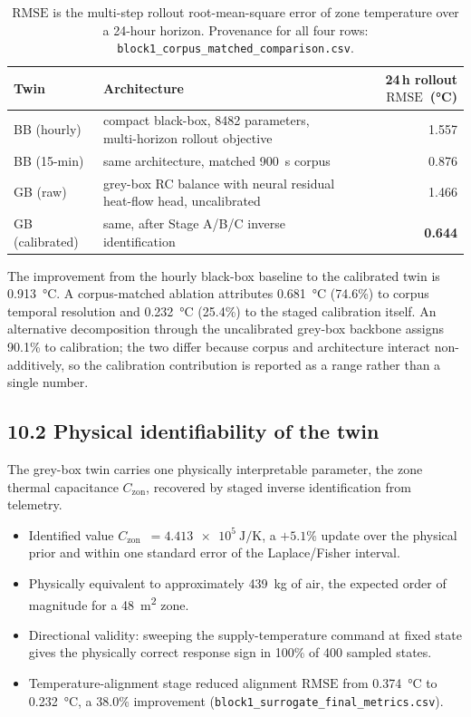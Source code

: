 \documentclass[11pt,a4paper]{article}
\newcommand{\RMSE}{\ensuremath{\mathrm{RMSE}}}
\newcommand{\Czon}{\ensuremath{C_{\mathrm{zon}}}}
\begin{document}
\begin{table}[h]
\centering\small
\begin{tabularx}{\linewidth}{@{}lXr@{}}
\toprule
Twin & Architecture & 24\,h rollout \RMSE\ (\si{\celsius}) \\
\midrule
BB (hourly) & compact black-box, 8482 parameters, multi-horizon rollout objective & 1.557 \\
BB (15-min) & same architecture, matched \SI{900}{\second} corpus & 0.876 \\
GB (raw) & grey-box RC balance with neural residual heat-flow head, uncalibrated & 1.466 \\
GB (calibrated) & same, after Stage A/B/C inverse identification & \textbf{0.644} \\
\bottomrule
\end{tabularx}
\caption*{\small\RMSE{} is the multi-step rollout root-mean-square error of zone temperature over a
24-hour horizon. Provenance for all four rows:
\texttt{block1\_corpus\_matched\_comparison.csv}.}
\end{table}

The improvement from the hourly black-box baseline to the calibrated twin is
\SI{0.913}{\celsius}. A corpus-matched ablation attributes \SI{0.681}{\celsius} (74.6\%) to
corpus temporal resolution and \SI{0.232}{\celsius} (25.4\%) to the staged calibration itself. An
alternative decomposition through the uncalibrated grey-box backbone assigns 90.1\% to
calibration; the two differ because corpus and architecture interact non-additively, so the
calibration contribution is reported as a range rather than a single number.

\subsection*{10.2 Physical identifiability of the twin}

The grey-box twin carries one physically interpretable parameter, the zone thermal capacitance
\Czon, recovered by staged inverse identification from telemetry.

\begin{itemize}[leftmargin=1.2em,itemsep=2pt]
\item Identified value \Czon\ $=\SI{4.413e5}{\joule\per\kelvin}$, a $+5.1\%$ update over the
physical prior and within one standard error of the Laplace/Fisher interval.
\item Physically equivalent to approximately \SI{439}{\kilogram} of air, the expected order of
magnitude for a \SI{48}{\meter\squared} zone.
\item Directional validity: sweeping the supply-temperature command at fixed state gives the
physically correct response sign in 100\% of 400 sampled states.
\item Temperature-alignment stage reduced alignment \RMSE{} from \SI{0.374}{\celsius} to
\SI{0.232}{\celsius}, a 38.0\% improvement
(\texttt{block1\_surrogate\_final\_metrics.csv}).
\end{itemize}
\end{document}
